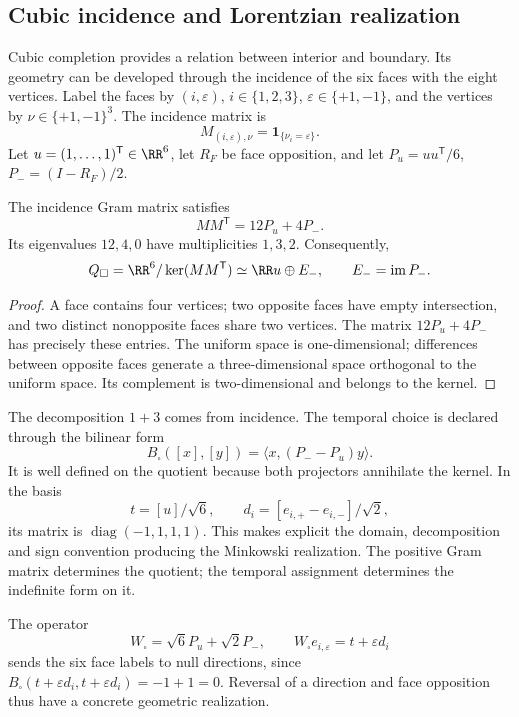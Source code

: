 \subsection{Cubic incidence and Lorentzian realization}

Cubic completion provides a relation between interior and boundary.
Its geometry can be developed through the incidence of the six faces
with the eight vertices. Label the faces by \((i,\varepsilon)\),
\(i\in\{1,2,3\}\), \(\varepsilon\in\{+1,-1\}\), and the vertices by
\(\nu\in\{+1,-1\}^3\). The incidence matrix is
\[
 M_{(i,\varepsilon),\nu}=\mathbf1_{\{\nu_i=\varepsilon\}}.
\]
Let \(u=(1,\ldots,1)^{\mathsf T}\in\RR^6\), let \(R_F\) be face
opposition, and let \(P_u=uu^{\mathsf T}/6\), \(P_-=(I-R_F)/2\).

\begin{proposition}
The incidence Gram matrix satisfies
\[
 MM^{\mathsf T}=12P_u+4P_-.
\]
Its eigenvalues \(12,4,0\) have multiplicities \(1,3,2\).
Consequently,
\[
 Q_\square=\RR^6/\ker(MM^{\mathsf T})
 \simeq\RR u\oplus E_-,\qquad E_-=\operatorname{im}P_-.
\]
\end{proposition}
\begin{proof}
A face contains four vertices; two opposite faces have empty
intersection, and two distinct nonopposite faces share two vertices.
The matrix \(12P_u+4P_-\) has precisely these entries.
The uniform space is one-dimensional; differences between opposite
faces generate a three-dimensional space orthogonal to the uniform space.
Its complement is two-dimensional and belongs to the kernel.
\end{proof}

The decomposition \(1+3\) comes from incidence. The temporal choice
is declared through the bilinear form
\[
 B_\square([x],[y])=\langle x,(P_--P_u)y\rangle.
\]
It is well defined on the quotient because both projectors annihilate the
kernel. In the basis
\[
 t=[u]/\sqrt6,\qquad
 d_i=[e_{i,+}-e_{i,-}]/\sqrt2,
\]
its matrix is \(\operatorname{diag}(-1,1,1,1)\). This makes explicit
the domain, decomposition and sign convention producing
the Minkowski realization. The positive Gram matrix determines the quotient;
the temporal assignment determines the indefinite form on it.

The operator
\[
 W_\square=\sqrt6P_u+\sqrt2P_-,\qquad
 W_\square e_{i,\varepsilon}=t+\varepsilon d_i
\]
sends the six face labels to null directions, since
\(B_\square(t+\varepsilon d_i,t+\varepsilon d_i)=-1+1=0\).
Reversal of a direction and face opposition thus have
a concrete geometric realization.

